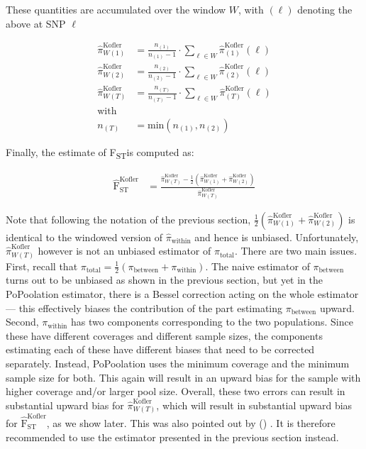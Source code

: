 \documentclass[letterpaper,fontsize=9pt,DIV=12]{scrartcl}
\newcommand\citeay[1]{\citeauthor{#1} (\citeyear{#1}) \cite{#1}}
\newcommand{\fst}{F\textsubscript{ST}}
\begin{document}
These quantities are accumulated over the window $W$, with $(\ell)$ denoting the above at SNP $\ell$

\begin{align}
    \label{eq:PoPoolation2FstWindow:1}
    \widehat{\pi}_{W(1)}^\text{Kofler} &= \frac{n_{(1)}}{n_{(1)}-1} \cdot \sum_{\ell\in W} \widehat{\pi}_{(1)}^\text{Kofler}(\ell)\\
    \label{eq:PoPoolation2FstWindow:2}
    \widehat{\pi}_{W(2)}^\text{Kofler} &= \frac{n_{(2)}}{n_{(2)}-1} \cdot \sum_{\ell\in W} \widehat{\pi}_{(2)}^\text{Kofler}(\ell)\\
    \label{eq:PoPoolation2FstWindow:T}
    \widehat{\pi}_{W(T)}^\text{Kofler} &= \frac{n_{(T)}}{n_{(T)}-1} \cdot \sum_{\ell\in W}  \widehat{\pi}_{(T)}^\text{Kofler}(\ell)\\
    \nonumber
    \mbox{with} \\
    \nonumber
    n_{(T)} &= \mbox{min} \left( n_{(1)}, n_{(2)} \right)
\end{align}

Finally, the estimate of \fst is computed as:

\begin{align}
    \label{eq:PoPoolation2FstEst}
    \widehat{\text{F}}_\text{ST}^\text{Kofler} &= \frac{ \widehat{\pi}_{W(T)}^\text{Kofler} - \frac{1}{2} \left(     \widehat{\pi}_{W(1)}^\text{Kofler} +     \widehat{\pi}_{W(2)}^\text{Kofler}  \right)}{ \widehat{\pi}_{W(T)}^\text{Kofler}}
\end{align}

Note that following the notation of the previous section, $\frac{1}{2}\left(\widehat{\pi}_{W(1)}^\text{Kofler} + \widehat{\pi}_{W(2)}^\text{Kofler}\right)$ is identical to the windowed version of $\widehat{\pi}_\text{within}$ and hence is unbiased.  Unfortunately, $\widehat{\pi}_{W(T)}^\text{Kofler}$ however is not an unbiased estimator of $\pi_\text{total}$.  There are two main issues.  First, recall that $\pi_\text{total} = \frac{1}{2}\left(\pi_\text{between}  + \pi_\text{within} \right)$.  The naive estimator of $\pi_\text{between}$ turns out to be unbiased as shown in the previous section, but yet in the PoPoolation estimator, there is a Bessel correction acting on the whole estimator --- this effectively biases the contribution of the part estimating $\pi_\text{between}$ upward.  Second, $\pi_\text{within}$ has two components corresponding to the two populations.  Since these have different coverages and different sample sizes, the components estimating each of these have different biases that need to be corrected separately.  Instead, PoPoolation uses the minimum coverage and the minimum sample size for both.  This again will result in an upward bias for the sample with higher coverage and/or larger pool size.  Overall, these two errors can result in substantial upward bias for $\widehat{\pi}_{W(T)}^\text{Kofler}$, which will result in substantial upward bias for $\widehat{\text{F}}_\text{ST}^\text{Kofler}$, as we show later.  This was also pointed out by \citeay{Hivert2018}. It is therefore recommended to use the estimator presented in the previous section instead.
\end{document}
